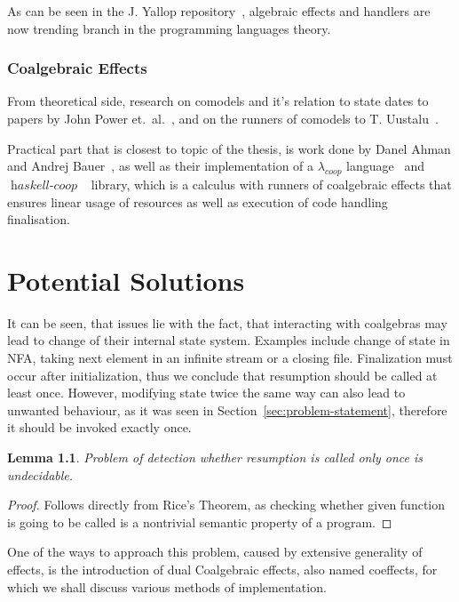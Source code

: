 \documentclass[declaration,shortabstract]{iithesis}
\theoremstyle{definition} \newtheorem{definition}{Definition}[chapter]
\theoremstyle{remark} \newtheorem{remark}[definition]{Observation}
\theoremstyle{plain} \newtheorem{theorem}[definition]{Theorem}
\theoremstyle{plain} \newtheorem{lemma}[definition]{Lemma}
\newcommand{\mathVar}[1]{{\operatorname{\mathit{#1}}}}
\begin{document}
    As can be seen in the J. Yallop repository~\cite{effects-bibliography}, algebraic
    effects and handlers are now trending branch in the programming languages theory.

    \subsection{Coalgebraic Effects}

    From theoretical side, research on comodels and it's relation to state
    dates to papers by John Power et.\ al.~\cite{comodels, tensors}, and on
    the runners of comodels to T. Uustalu~\cite{runners-uustalu}.

    Practical part that is closest to topic of the thesis, is work done by
    Danel Ahman and Andrej Bauer~\cite{runners-in-action}, as well as their
    implementation of a $\lambda_{coop}$ language~\cite{coop} and
    $\mathVar{haskell-coop}$~\cite{haskell-coop} library, which is a
    calculus with runners of coalgebraic effects that ensures linear usage of
    resources as well as execution of code handling finalisation.

\chapter{Potential Solutions}\label{chapter:potential-solutions}

It can be seen, that issues lie with the fact, that interacting with coalgebras
may lead to change of their internal state system. Examples include change of
state in NFA, taking next element in an infinite stream or a closing file.
Finalization must occur after initialization, thus we conclude that resumption
should be called at least once. However, modifying state twice the same way can
also lead to unwanted behaviour, as it was seen in
Section~\ref{sec:problem-statement}, therefore it should be invoked exactly
once.

\begin{lemma}
    Problem of detection whether resumption is called only once is undecidable.
\end{lemma}
\begin{proof}
    Follows directly from Rice's Theorem, as checking whether given function is
    going to be called is a nontrivial semantic property of a program.
\end{proof}

One of the ways to approach this problem, caused by extensive generality of
effects, is the introduction of dual Coalgebraic effects, also named coeffects,
for which we shall discuss various methods of implementation.
\end{document}
